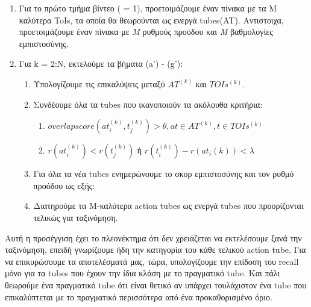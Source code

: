 \begin{enumerate}
\item Για το πρώτο τμήμα βίντεο ( = 1), προετοιμάζουμε έναν πίνακα με τα Μ καλύτερα \en ToIs\gr,  τα  οποία θα θεωρούνται
  ως ενεργά \en tubes\gr(AT).
Αντιστοιχα, προετοιμάζουμε έναν πίνακα με \textit{M} ρυθμούς προόδου και \textit{M} βαθμολογίες εμπιστοσύνης.
\item Για \en k = 2:N\gr, εκτελούμε τα βήματα (a') - (g'):
  \begin{enumerate}
  \item Υπολογίζουμε τις επικαλύψεις μεταξύ $ AT^{(k)} $ και $ TOIs^{(k)}. $
  \item Συνδέουμε όλα τα \en tubes \gr που ικανοποιούν τα ακόλουθα κριτήρια:
    \begin{enumerate}
    \item $ overlap score(at_i^{(k)},t_j^{(k)})   > \theta, 
      at  \in AT^{(k)}, t \in TOIs^{(k)}  $
    \item $r(at_i^{(k)}) < r(t_j^{(k)}) $ ή
      $r(t_i^{(k)}) - r(at_i{(k)}) < \lambda $
    \end{enumerate}
    
  \item Για όλα τα νέα \en tubes \gr ενημερώνουμε το σκορ εμπιστοσύνης και τον ρυθμό προόδου ως εξής:

  \item Διατηρούμε  τα M-καλύτερα \en action tubes \gr  ως ενεργά \en tubes \gr που προορίζονται τελικώς για ταξινόμηση.
  \end{enumerate}
  
\end{enumerate}

Αυτή η προσέγγιση έχει το πλεονέκτημα ότι δεν χρειάζεται να εκτελέσουμε ξανά την ταξινόμηση, επειδή γνωρίζουμε ήδη την κατηγορία του
κάθε τελικού \en action tube\gr. Για να επικυρώσουμε τα αποτελέσματά μας, τώρα, υπολογίζουμε την επίδοση του \en recall \gr μόνο για τα \en tubes \gr
που έχουν την ίδια κλάση με το πραγματικό \en tube\gr. Και πάλι θεωρούμε ένα πραγματικό  \en tube \gr ότι είναι θετικό αν υπάρχει
τουλάχιστον ένα \en tube \gr που επικαλύπτεται με το πραγματικό περισσότερα από ένα προκαθορισμένο όριο.

